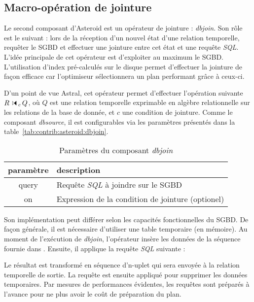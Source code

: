 \subsection{Macro-opération de jointure}
Le second composant d'Asteroid est un opérateur de jointure : \textit{dbjoin}. Son rôle est le suivant : lors de la réception d'un nouvel état d'une relation temporelle, requêter le SGBD et effectuer une jointure entre cet état et une requête \textit{SQL}. L'idée principale de cet opérateur est d'exploiter au maximum le SGBD. L'utilisation d'index pré-calculés sur le disque permet d'effectuer la jointure de façon efficace car l'optimiseur sélectionnera un plan performant grâce à ceux-ci.

D'un point de vue Astral, cet opérateur permet d'effectuer l'opération suivante $R \ssjoin_c Q$, où $Q$ est une relation temporelle exprimable en algèbre relationnelle sur les relations de la base de donnée, et $c$ une condition de jointure. Comme le composant \textit{dbsource}, il est configurables via les paramètres présentés dans la table~\ref{tab:contrib:asteroid:dbjoin}.
\begin{table}[ht]
    \centering
    \begin{tabular}{cl}
        paramètre & description \\ \midrule
        query & Requête \textit{SQL} à joindre sur le SGBD \\
        on & Expression de la condition de jointure (optionel)
    \end{tabular}
    \caption{Paramètres du composant \textit{dbjoin}}\label{tab:contrib:asteroid:dbsource}
\end{table}

Son implémentation peut différer selon les capacités fonctionnelles du SGBD. De façon générale, il est nécessaire d'utiliser une table temporaire  (en mémoire). Au moment de l'exécution de \textit{dbjoin}, l'opérateur insère les données de la séquence fournie dans . Ensuite, il applique la requête \textit{SQL} suivante : \begin{center}  \end{center}
Le résultat est transformé en séquence d'n-uplet qui sera envoyée à la relation temporelle de sortie. La requête  est ensuite appliqué pour supprimer les données temporaires. Par mesures de performances évidentes, les requêtes sont préparés à l'avance pour ne plus avoir le coût de préparation du plan.

